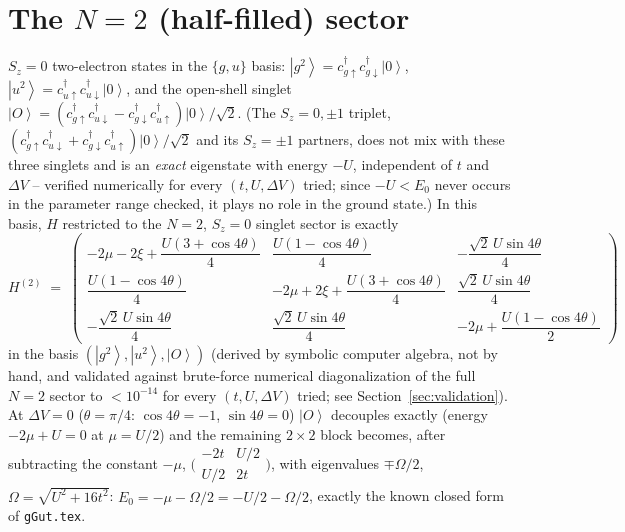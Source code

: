 \documentclass[11pt]{article}
\newcommand{\ket}[1]{\left|#1\right\rangle}
\begin{document}
\section{The $N=2$ (half-filled) sector}
\label{sec:N2}

$S_z=0$ two-electron states in the $\{g,u\}$ basis:
$\ket{g^2}=c^{\dagger}_{g\uparrow}c^{\dagger}_{g\downarrow}\ket0$,
$\ket{u^2}=c^{\dagger}_{u\uparrow}c^{\dagger}_{u\downarrow}\ket0$, and the open-shell
singlet $\ket{O}=(c^{\dagger}_{g\uparrow}c^{\dagger}_{u\downarrow}-c^{\dagger}_{g\downarrow}c^{\dagger}_{u\uparrow})\ket0/\sqrt2$.
(The $S_z=0,\pm1$ triplet, $(c^{\dagger}_{g\uparrow}c^{\dagger}_{u\downarrow}+c^{\dagger}_{g\downarrow}c^{\dagger}_{u\uparrow})\ket0/\sqrt2$
and its $S_z=\pm1$ partners, does not mix with these three singlets and is an \emph{exact}
eigenstate with energy $-U$, independent of $t$ and $\Delta V$ -- verified numerically for
every $(t,U,\Delta V)$ tried; since $-U<E_0$ never occurs in the parameter range checked,
it plays no role in the ground state.) In this basis, $H$ restricted to the $N{=}2$,
$S_z{=}0$ singlet sector is exactly
\begin{equation}
  H^{(2)} \;=\;
  \begin{pmatrix}
    -2\mu-2\xi+\dfrac{U(3+\cos4\theta)}{4} & \dfrac{U(1-\cos4\theta)}{4} & -\dfrac{\sqrt2\,U\sin4\theta}{4}\\[2.2ex]
    \dfrac{U(1-\cos4\theta)}{4} & -2\mu+2\xi+\dfrac{U(3+\cos4\theta)}{4} & \dfrac{\sqrt2\,U\sin4\theta}{4}\\[2.2ex]
    -\dfrac{\sqrt2\,U\sin4\theta}{4} & \dfrac{\sqrt2\,U\sin4\theta}{4} & -2\mu+\dfrac{U(1-\cos4\theta)}{2}
  \end{pmatrix}
  \label{eq:H2}
\end{equation}
in the basis $(\ket{g^2},\ket{u^2},\ket{O})$ (derived by symbolic computer algebra, not by
hand, and validated against brute-force numerical diagonalization of the full $N{=}2$
sector to $<10^{-14}$ for every $(t,U,\Delta V)$ tried; see Section~\ref{sec:validation}).
At $\Delta V=0$ ($\theta=\pi/4$: $\cos4\theta=-1$, $\sin4\theta=0$) $\ket O$ decouples
exactly (energy $-2\mu+U=0$ at $\mu=U/2$) and the remaining $2\times2$ block becomes,
after subtracting the constant $-\mu$,
$\bigl(\begin{smallmatrix}-2t&U/2\\U/2&2t\end{smallmatrix}\bigr)$, with eigenvalues
$\mp\Omega/2$, $\Omega=\sqrt{U^2+16t^2}$: $E_0=-\mu-\Omega/2=-U/2-\Omega/2$, exactly the
known closed form of \texttt{gGut.tex}.
\end{document}
